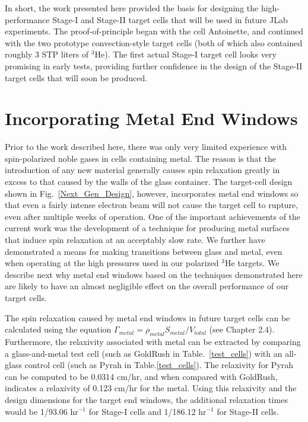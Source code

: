 In short, the work presented here provided the basis for designing the high-performance Stage-I and Stage-II target cells that will be used in future JLab experiments. The proof-of-principle began with the cell Antoinette, and continued with the two prototype convection-style target cells (both of which
also contained roughly 3 STP liters of $^3$He). The first actual Stage-I target cell looks very promising in early tests, providing further confidence in the design of the Stage-II target cells that will soon be produced.

\section{Incorporating Metal End Windows}

Prior to the work described here, there was only very limited experience with spin-polarized noble gases in cells containing metal. The reason is that the introduction of any new material  generally causes spin relaxation greatly in excess to that caused by the walls of the glass container. The target-cell design shown in Fig.~\ref{Next_Gen_Design}, however, incorporates metal end windows so that even a fairly intense electron beam will not cause the target cell to rupture, even after multiple weeks of operation. One of the important achievements
of the current work was the development of a technique for producing metal surfaces that induce spin relaxation at an acceptably slow rate. We further have demonstrated a means for making transitions between glass and metal, even when operating at the high pressures used in our polarized $^3$He targets. We describe
next why metal end windows based on the techniques demonstrated here are likely to have an almost negligible effect on the overall performance of our target cells.

The spin relaxation caused by metal end windows in future target cells can be calculated using the equation $\Gamma_{metal} = \rho_{metal} S_{metal}/V_{total}$ (see Chapter 2.4). Furthermore, the relaxivity associated with metal can be extracted by comparing a glass-and-metal test cell (such as GoldRush in Table.~\ref{test_cells}) with an all-glass control cell (such as Pyrah in Table.\ref{test_cells}). The relaxivity for Pyrah can be computed to be 0.0314 cm/hr, and when compared with GoldRush, indicates a relaxivity of 0.123 cm/hr for the metal. Using this relaxivity and the design dimensions for the target end windows, the additional relaxation times would be 1/93.06 hr$^{-1}$ for Stage-I cells and 1/186.12 hr$^{-1}$ for Stage-II cells.

